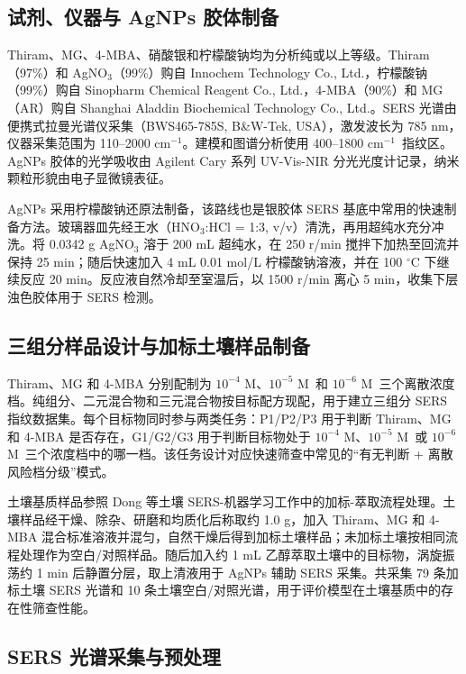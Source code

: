 \documentclass[preprint,12pt]{elsarticle}
\newcommand{\cmone}{cm$^{-1}$}
\newcommand{\molA}{$10^{-4}$ M}
\newcommand{\molB}{$10^{-5}$ M}
\newcommand{\molC}{$10^{-6}$ M}
\begin{document}
\subsection{试剂、仪器与 AgNPs 胶体制备}

Thiram、MG、4-MBA、硝酸银和柠檬酸钠均为分析纯或以上等级。Thiram（97\%）和 AgNO$_3$（99\%）购自 Innochem Technology Co., Ltd.，柠檬酸钠（99\%）购自 Sinopharm Chemical Reagent Co., Ltd.，4-MBA（90\%）和 MG（AR）购自 Shanghai Aladdin Biochemical Technology Co., Ltd.。SERS 光谱由便携式拉曼光谱仪采集（BWS465-785S, B\&W-Tek, USA），激发波长为 785 nm，仪器采集范围为 110--2000 \cmone。建模和图谱分析使用 400--1800 \cmone\ 指纹区。AgNPs 胶体的光学吸收由 Agilent Cary 系列 UV-Vis-NIR 分光光度计记录，纳米颗粒形貌由电子显微镜表征。

AgNPs 采用柠檬酸钠还原法制备，该路线也是银胶体 SERS 基底中常用的快速制备方法\cite{TianJFCA2025}。玻璃器皿先经王水（HNO$_3$:HCl = 1:3, v/v）清洗，再用超纯水充分冲洗。将 0.0342 g AgNO$_3$ 溶于 200 mL 超纯水，在 250 r/min 搅拌下加热至回流并保持 25 min；随后快速加入 4 mL 0.01 mol/L 柠檬酸钠溶液，并在 100 $^\circ$C 下继续反应 20 min。反应液自然冷却至室温后，以 1500 r/min 离心 5 min，收集下层浊色胶体用于 SERS 检测。

\subsection{三组分样品设计与加标土壤样品制备}

Thiram、MG 和 4-MBA 分别配制为 \molA、\molB\ 和 \molC\ 三个离散浓度档。纯组分、二元混合物和三元混合物按目标配方现配，用于建立三组分 SERS 指纹数据集。每个目标物同时参与两类任务：P1/P2/P3 用于判断 Thiram、MG 和 4-MBA 是否存在，G1/G2/G3 用于判断目标物处于 \molA、\molB\ 或 \molC\ 三个浓度档中的哪一档。该任务设计对应快速筛查中常见的“有无判断 + 离散风险档分级”模式。

土壤基质样品参照 Dong 等土壤 SERS-机器学习工作中的加标-萃取流程处理\cite{SoilThiram}。土壤样品经干燥、除杂、研磨和均质化后称取约 1.0 g，加入 Thiram、MG 和 4-MBA 混合标准溶液并混匀，自然干燥后得到加标土壤样品；未加标土壤按相同流程处理作为空白/对照样品。随后加入约 1 mL 乙醇萃取土壤中的目标物，涡旋振荡约 1 min 后静置分层，取上清液用于 AgNPs 辅助 SERS 采集。共采集 79 条加标土壤 SERS 光谱和 10 条土壤空白/对照光谱，用于评价模型在土壤基质中的存在性筛查性能。

\subsection{SERS 光谱采集与预处理}
\end{document}
